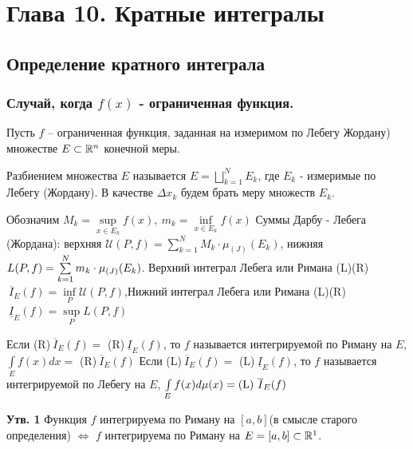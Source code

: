 \setcounter{section}{9}
\section{Глава 10. Кратные интегралы}
\subsection{Определение кратного интеграла}
\subsubsection{Случай, когда $f(x)$ - ограниченная функция.}
\begin{Def}
Пусть $f$ -- ограниченная функция, заданная на измеримом по Лебегу Жордану) множестве $E \subset \R^n$ конечной меры. 

$\textbf{Разбиением}$ множества $E$ называется $E=\bigsqcup\limits_{k=1}^N E_k$, где $E_k$ - измеримые по Лебегу (Жордану). \newline В качестве $\Delta x_k$ будем брать меру множеств $E_k$. 

Обозначим $M_k=\sup\limits_{x\in E_k} f\left(x\right) ,\  m_k=\inf\limits_{x\in E_k}f\left(x\right)$ \newline
Суммы Дарбу - Лебега (Жордана): верхняя $\mathcal{U}(P, f)=\sum\limits_{k=1}^N M_k \cdot \mu_{(J)}(E_k)$, нижняя $L(P, f)\?=\sum\limits_{k=1}^N m_k \cdot \mu_{(J)}(E_k)$.
\newline Верхний интеграл Лебега или Римана (L)(R)$\ \overline{I}_E(f)=\inf\limits_P \mathcal{U}(P, f)$,\newline Нижний интеграл Лебега или Римана (L)(R)$\ \underline{I}_E(f)=\sup\limits_P L(P, f)$
\end{Def}
\begin{Def}
Если (R)$\ \overline{I}_E(f)=$ (R)$\ \underline{I}_E(f)$, то $f$ называется интегрируемой по Риману на $E$, $\int\limits_E f(x)dx=$ (R)$\ \overline{I}_E(f)$ \newline
Если (L)$\ \overline{I}_E(f)=$ (L)$\ \underline{I}_E(f)$, то $f$ называется интегрируемой по Лебегу на $E$, $\int\limits_E f(x)d\mu (x)\?= \text{(L) }\overline{I}_E(f)$
\end{Def}
\textbf{Утв. 1} Функция $f$ интегрируема по Риману на $[a,b]$(в смысле старого определения) $\Leftrightarrow$ $f$ интегрируема по Риману на $E=[a,b] \subset \R^1$.
